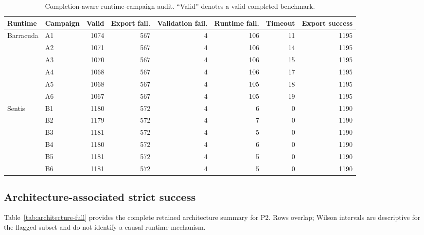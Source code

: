 \begin{table}[t]
\centering
\caption{Completion-aware runtime-campaign audit. ``Valid'' denotes a valid completed benchmark.}
\label{tab:campaign-audit}
\small
\begin{tabular}{@{}llrrrrrr@{}}
\toprule
Runtime & Campaign & Valid & Export fail. & Validation fail. & Runtime fail. & Timeout & Export success \\
\midrule
Barracuda & A1 & 1074 & 567 & 4 & 106 & 11 & 1195 \\
& A2 & 1071 & 567 & 4 & 106 & 14 & 1195 \\
& A3 & 1070 & 567 & 4 & 106 & 15 & 1195 \\
& A4 & 1068 & 567 & 4 & 106 & 17 & 1195 \\
& A5 & 1068 & 567 & 4 & 105 & 18 & 1195 \\
& A6 & 1067 & 567 & 4 & 105 & 19 & 1195 \\
\midrule
Sentis & B1 & 1180 & 572 & 4 & 6 & 0 & 1190 \\
& B2 & 1179 & 572 & 4 & 7 & 0 & 1190 \\
& B3 & 1181 & 572 & 4 & 5 & 0 & 1190 \\
& B4 & 1180 & 572 & 4 & 6 & 0 & 1190 \\
& B5 & 1181 & 572 & 4 & 5 & 0 & 1190 \\
& B6 & 1181 & 572 & 4 & 5 & 0 & 1190 \\
\bottomrule
\end{tabular}
\end{table}

\subsection{Architecture-associated strict success}
Table~\ref{tab:architecture-full} provides the complete retained architecture summary for P2. Rows overlap; Wilson intervals are descriptive for the flagged subset and do not identify a causal runtime mechanism.

